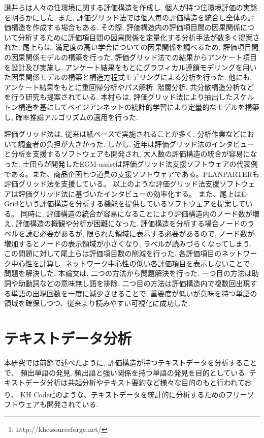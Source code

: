 \documentclass[syuuron]{kuee}
\begin{document}
		讃井らは人々の住環境に関する評価構造を作成し, 個人が持つ住環境評価の実態を明らかにした. 
		また, 評価グリッド法では個人毎の評価構造を統合し全体の評価構造を作成する場合もある. 
		その際, 評価構造内の評価項目間の因果関係について分析するために評価項目間の因果関係を定量化する分析手法が数多く提案された. 
		尾上らは, 満足度の高い学会についての因果関係を調べるため, 評価項目間の因果関係モデルの構築を行った\cite{egm8}. 
		評価グリッド法での結果からアンケート項目を設計及び実施し, アンケート結果をもとにグラフィカル連鎖モデリングを用いた因果関係モデルの構築と構造方程式モデリングによる分析を行った. 
		他にも, アンケート結果をもとに重回帰分析やパス解析, 階層分析, 共分散構造分析などを行う研究も提案されている. 
		本村らは, 評価グリッド法により抽出したスケルトン構造を基にしてベイジアンネットの統計的学習により定量的なモデルを構築し, 確率推論アルゴリズムの適用を行った\cite{egm9}. 
		
		評価グリッド法は, 従来は紙ベースで実施されることが多く, 分析作業などにおいて調査者の負担が大きかった. 
		しかし, 近年は評価グリッド法のインタビューと分析を支援するソフトウェアも開発され, 大人数の評価構造の統合が容易になった. 
		土田らが開発したEGM-assistは評価グリッド法支援ソフトウェアの代表例である。また、商品企画七つ道具の支援ソフトウェアである。PLANPARTERも評価グリッド法を支援している。
		以上のような評価グリッド法支援ソフトウェアは評価グリッド法に基づいたインタビューの効率化する。
		また、尾上はE-Gridという評価構造を分析する機能を提供しているソフトウェアを提案している。
		同時に, 評価構造の統合が容易になることにより評価構造内のノード数が増え, 評価構造の概観や分析が困難になった. 
		評価構造を分析する場合ノードのラベルを読む必要があるが, 限られた領域に表示する必要があるので, 
		ノード数が増加するとノードの表示領域が小さくなり, ラベルが読みづらくなってしまう. 
		この問題に対して尾上らは評価項目数の削減を行った\cite{net1}. 
		各評価項目のネットワーク中心性を計算し, ネットワーク中心性の低い各評価項目を表示しないことで, 問題を解決した. 
		本論文は, 二つの方法から問題解決を行った. 
		一つ目の方法は助詞や助動詞などの意味無し語を排除. 二つ目の方法は評価構造内で複数回出現する単語の出現回数を一度に減少させることで, 
		重要度が低いが意味を持つ単語の領域を確保しつつ、従来より読みやすい可視化に成功した. 
		
	\section{テキストデータ分析}
		本研究では前節で述べたように, 評価構造が持つテキストデータを分析することで、
		頻出単語の発見, 頻出語と強い関係を持つ単語の発見を目的としている.  
		テキストデータ分析は共起分析やテキスト要約など様々な目的のもと行われており、
		KH Coder\footnote{http://khc.sourceforge.net/}のような、テキストデータを統計的に分析するためのフリーソフトウェアも開発されている. 
		
\end{document}
